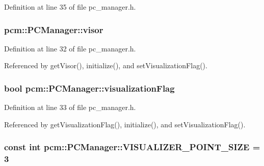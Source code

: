 Definition at line 35 of file pc\-\_\-manager.\-h.

\hypertarget{classpcm_1_1PCManager_a114916eb53bacdd547331d0de53d6ced}{
\subsubsection[{visor}]{ pcm\-::\-P\-C\-Manager\-::visor\hspace{0.3cm}{\ttfamily [private]}}}\label{classpcm_1_1PCManager_a114916eb53bacdd547331d0de53d6ced}


Definition at line 32 of file pc\-\_\-manager.\-h.



Referenced by get\-Visor(), initialize(), and set\-Visualization\-Flag().

\hypertarget{classpcm_1_1PCManager_af2215813be83c41ca788a40614c9fadb}{
\subsubsection[{visualization\-Flag}]{\setlength{\rightskip}{0pt plus 5cm}bool pcm\-::\-P\-C\-Manager\-::visualization\-Flag\hspace{0.3cm}{\ttfamily [private]}}}\label{classpcm_1_1PCManager_af2215813be83c41ca788a40614c9fadb}


Definition at line 33 of file pc\-\_\-manager.\-h.



Referenced by get\-Visualization\-Flag(), initialize(), and set\-Visualization\-Flag().

\hypertarget{classpcm_1_1PCManager_abb62ef760d6d8436c18cac80bb111898}{
\subsubsection[{V\-I\-S\-U\-A\-L\-I\-Z\-E\-R\-\_\-\-P\-O\-I\-N\-T\-\_\-\-S\-I\-Z\-E}]{\setlength{\rightskip}{0pt plus 5cm}const int pcm\-::\-P\-C\-Manager\-::\-V\-I\-S\-U\-A\-L\-I\-Z\-E\-R\-\_\-\-P\-O\-I\-N\-T\-\_\-\-S\-I\-Z\-E = 3\hspace{0.3cm}{\ttfamily [static]}}}\label{classpcm_1_1PCManager_abb62ef760d6d8436c18cac80bb111898}



